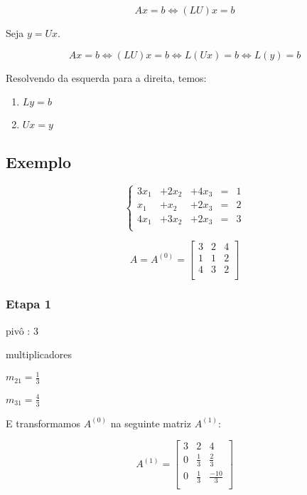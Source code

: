 \documentclass[a4paper]{article}
\begin{document}
\begin{displaymath}
  Ax = b \iff (LU)x=b
\end{displaymath}

Seja $y = Ux$. 

\begin{displaymath}
  Ax = b \iff (LU)x=b \iff L(Ux)=b \iff L(y) = b
\end{displaymath}

Resolvendo da esquerda para a direita, temos:

\begin{enumerate}
\item $Ly = b$
\item $Ux = y$
\end{enumerate}

\subsection*{Exemplo}

\begin{displaymath}
  \left\{
  \begin{array}{ccccc}
    3x_1 &+ 2x_2 &+ 4x_3 &=&1\\
    x_1 &+ x_2 &+ 2x_3 &=& 2\\
    4x_1 &+ 3x_2 &+ 2x_3 &=& 3\\
  \end{array}
\right.
\end{displaymath}

\begin{displaymath}
  A = A^{(0)} = \begin{bmatrix}
    3 & 2 & 4 \\
    1 & 1 & 2 \\
    4 & 3 & 2 \\
  \end{bmatrix}
\end{displaymath}


\subsubsection*{Etapa 1}
pivô : $3$

multiplicadores 

$m_{21}= \frac{1}{3}$

$m_{31} = \frac{4}{3}$

E transformamos $A^{(0)}$ na seguinte matriz $A^{(1)}$:

\begin{displaymath}
  A^{(1)} = \begin{bmatrix}
    3 & 2 & 4\\
    0 & \frac{1}{3} & \frac{2}{3}\\
    0 & \frac{1}{3} & \frac{-10}{3}\\
  \end{bmatrix}
\end{displaymath}
\end{document}
